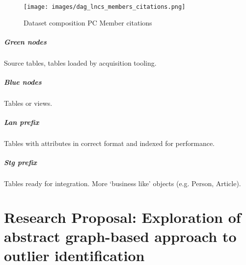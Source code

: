 \documentclass{ou-report}
\begin{document}
\begin{multicols}{2}
\begin{figure}[H]
    \centering
    \texttt{[image: images/dag\_lncs\_members\_citations.png]}
    \caption{Dataset composition PC Member citations}
    \label{fig:dataset_pc_member_citation}
\end{figure}

\paragraph{Green nodes} Source tables, tables loaded by acquisition tooling.
\paragraph{Blue nodes} Tables or views.
\paragraph{Lan prefix} Tables with attributes in correct format and indexed for performance.
\paragraph{Stg prefix} Tables ready for integration. More `business like' objects (e.g. Person, Article).

\end{multicols}







\chapter{Research Proposal: Exploration of abstract graph-based approach to outlier identification}
\label{chp:graph_based_approach}
\end{document}
